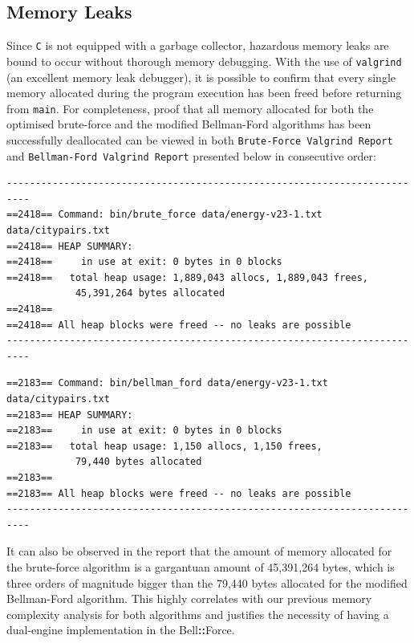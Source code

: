 \documentclass[11pt]{article}
\newcommand{\bellforce}{Bell\hspace*{1.61803398875pt}\textbf{::}\hspace*{1.61803398875pt}Force}
\begin{document}
\subsection{Memory Leaks}
Since \texttt{C} is not equipped with a garbage collector, hazardous memory leaks are bound to occur without thorough memory debugging. With the use of \texttt{valgrind} (an excellent memory leak debugger), it is possible to confirm that every single memory allocated during the program execution has been freed before returning from \texttt{main}. For completeness, proof that all memory allocated for both the optimised brute-force and the modified Bellman-Ford algorithms has been successfully deallocated can be viewed in both \texttt{Brute-Force Valgrind Report} and \texttt{Bellman-Ford Valgrind Report} presented below in consecutive order: 
\begin{verbatim}
--------------------------------------------------------------------------
==2418== Command: bin/brute_force data/energy-v23-1.txt data/citypairs.txt
==2418== HEAP SUMMARY:
==2418==     in use at exit: 0 bytes in 0 blocks
==2418==   total heap usage: 1,889,043 allocs, 1,889,043 frees, 
            45,391,264 bytes allocated
==2418== 
==2418== All heap blocks were freed -- no leaks are possible
--------------------------------------------------------------------------
\end{verbatim}
\begin{verbatim}
==2183== Command: bin/bellman_ford data/energy-v23-1.txt data/citypairs.txt
==2183== HEAP SUMMARY:
==2183==     in use at exit: 0 bytes in 0 blocks
==2183==   total heap usage: 1,150 allocs, 1,150 frees, 
            79,440 bytes allocated
==2183== 
==2183== All heap blocks were freed -- no leaks are possible
--------------------------------------------------------------------------
\end{verbatim}
It can also be observed in the report that the amount of memory allocated for the brute-force algorithm is a gargantuan amount of 45,391,264 bytes, which is three orders of magnitude bigger than the 79,440 bytes allocated for the modified Bellman-Ford algorithm. This highly correlates with our previous memory complexity analysis for both algorithms and justifies the necessity of having a dual-engine implementation in the \bellforce{}.
\end{document}
